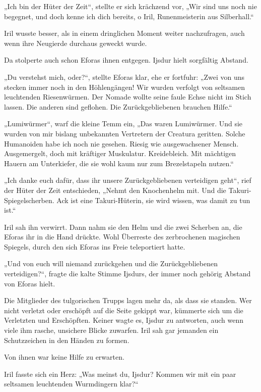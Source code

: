 „Ich bin der Hüter der Zeit“, stellte er sich krächzend vor, „Wir sind uns noch nie begegnet, und doch kenne ich dich bereits, o Iril, Runenmeisterin aus Silberhall.“

Iril wusste besser, als in einem dringlichen Moment weiter nachzufragen, auch wenn ihre Neugierde durchaus geweckt wurde.

Da stolperte auch schon Eforas ihnen entgegen. Ijsdur hielt sorgfältig Abstand.

„Du verstehst mich, oder?“, stellte Eforas klar, ehe er fortfuhr: „Zwei von uns stecken immer noch in den Höhlengängen! Wir wurden verfolgt von seltsamen leuchtenden Riesenwürmen. Der Nomade wollte seine faule Echse nicht im Stich lassen. Die anderen sind geflohen. Die Zurückgebliebenen brauchen Hilfe.“

„Lumiwürmer“, warf die kleine Temm ein, „Das waren Lumiwürmer. Und sie wurden von mir bislang unbekannten Vertretern der Creatura geritten. Solche Humanoiden habe ich noch nie gesehen. Riesig wie ausgewachsener Mensch. Ausgemergelt, doch mit kräftiger Muskulatur. Kreidebleich. Mit mächtigen Hauern am Unterkiefer, die sie wohl kaum nur zum Brezelstapeln nutzen.“

„Ich danke euch dafür, dass ihr unsere Zurückgebliebenen verteidigen geht“, rief der Hüter der Zeit entschieden, „Nehmt den Knochenhelm mit. Und die Takuri-Spiegelscherben. Ack ist eine Takuri-Hüterin, sie wird wissen, was damit zu tun ist.“

Iril sah ihn verwirrt. Dann nahm sie den Helm und die zwei Scherben an, die Eforas ihr in die Hand drückte. Wohl Überreste des zerbrochenen magischen Spiegels, durch den sich Eforas ins Freie teleportiert hatte.

„Und von euch will niemand zurückgehen und die Zurückgebliebenen verteidigen?“, fragte die kalte Stimme Ijsdurs, der immer noch gehörig Abstand von Eforas hielt.

Die Mitglieder des tulgorischen Trupps lagen mehr da, als dass sie standen. Wer nicht verletzt oder erschöpft auf die Seite gekippt war, kümmerte sich um die Verletzten und Erschöpften. Keiner wagte es, Ijsdur zu antworten, auch wenn viele ihm rasche, unsichere Blicke zuwarfen. Iril sah gar jemanden ein Schutzzeichen in den Händen zu formen.

Von ihnen war keine Hilfe zu erwarten.

Iril fasste sich ein Herz: „Was meinst du, Ijsdur? Kommen wir mit ein paar seltsamen leuchtenden Wurmdingern klar?“

